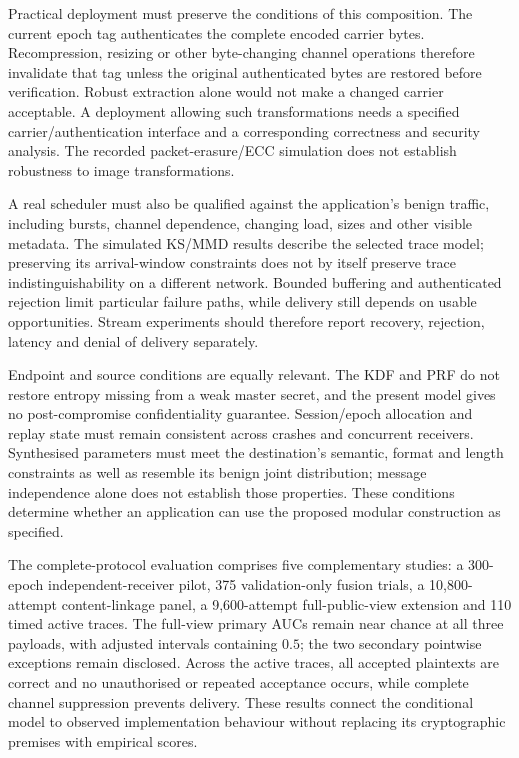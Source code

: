\documentclass[pdflatex,sn-mathphys-num]{sn-jnl}%
\theoremstyle{definition}
\theoremstyle{game}
\theoremstyle{thmstyleone}%
\theoremstyle{thmstyletwo}%
\theoremstyle{thmstylethree}%
\begin{document}
Practical deployment must preserve the conditions of this composition.
The current epoch tag authenticates the complete encoded carrier bytes.
Recompression, resizing or other byte-changing channel operations therefore
invalidate that tag unless the original authenticated bytes are restored
before verification. Robust extraction alone would not make a changed
carrier acceptable. A deployment allowing such transformations needs a
specified carrier/authentication interface and a corresponding correctness
and security analysis. The recorded packet-erasure/ECC simulation does
not establish robustness to image transformations.

A real scheduler must also be qualified against the application's benign
traffic, including bursts, channel dependence, changing load, sizes and
other visible metadata. The simulated KS/MMD results describe the selected
trace model; preserving its arrival-window constraints does not by itself
preserve trace indistinguishability on a different network. Bounded buffering
and authenticated rejection limit particular failure paths, while delivery
still depends on usable opportunities. Stream experiments should therefore
report recovery, rejection, latency and denial of delivery separately.

Endpoint and source conditions are equally relevant. The KDF and PRF do
not restore entropy missing from a weak master secret, and the present
model gives no post-compromise confidentiality guarantee. Session/epoch
allocation and replay state must remain consistent across crashes and
concurrent receivers. Synthesised parameters must meet the destination's
semantic, format and length constraints as well as resemble its benign
joint distribution; message independence alone does not establish those
properties. These conditions determine whether an application can use the
proposed modular construction as specified.

The complete-protocol evaluation comprises five complementary studies: a 300-epoch
independent-receiver pilot, 375 validation-only fusion trials, a
10,800-attempt content-linkage panel, a 9,600-attempt full-public-view
extension and 110 timed active traces. The full-view primary AUCs remain
near chance at all three payloads, with adjusted intervals containing
$0.5$; the two secondary pointwise exceptions remain disclosed.
Across the active traces, all accepted plaintexts are correct and no
unauthorised or repeated acceptance occurs, while complete channel
suppression prevents delivery. These results connect the conditional
model to observed implementation behaviour without replacing its
cryptographic premises with empirical scores.
\end{document}
